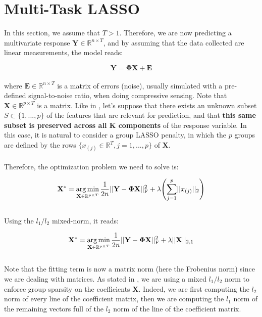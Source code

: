 \documentclass[a4paper,10pt]{article}
\theoremstyle{definition}
\begin{document}
\section{Multi-Task LASSO}
\label{section_4}

In this section, we assume that $T > 1$. Therefore, we are now predicting a multivariate response $\mathbf{Y}\in \mathbb{R}^{n \times T}$, and by assuming that the data collected are linear measurements, the model reads:

\begin{equation*}
    \mathbf{Y} = \mathbf{\Phi}\mathbf{X} + \mathbf{E}
\end{equation*}
\\
where $\mathbf{E} \in \mathbb{R}^{n \times T}$ is a matrix of errors (noise), usually simulated with a pre-defined signal-to-noise ratio, when doing compressive sensing. Note that $\mathbf{X} \in \mathbb{R}^{p \times T}$ is a matrix.
Like in , let's suppose that there exists an unknown subset $S \subset  \{1, ..., p\}$ of the features that are relevant for prediction, and that \textbf{this same subset is preserved across all K components} of the response
variable. In this case, it is natural to consider a group LASSO penalty, in which the $p$ groups are defined by the rows $\{x_{(j)} \in \mathbb{R}^T, j=1,...,p\}$ of $\mathbf{X}$.
\\
\\
Therefore, the optimization problem we need to solve is:

\begin{equation*}
    \mathbf{X}^* = \operatorname*{arg\,min}_{\mathbf{X} \in \mathbb{R}^{p \times T}} \frac{1}{2n} \lvert\lvert \mathbf{Y} - \mathbf{\Phi X} \rvert\rvert_{\text{F}}^2 + \lambda \Biggl( \sum_{j=1}^p \lvert\lvert x_{(j)} \rvert\rvert_2 \Biggr)
\end{equation*}
\\
Using the $l_1/l_2$ mixed-norm, it reads:

\begin{equation*}
    \mathbf{X}^* = \operatorname*{arg\,min}_{\mathbf{X} \in \mathbb{R}^{p \times T}} \frac{1}{2n} \lvert\lvert \mathbf{Y} - \mathbf{\Phi X} \rvert\rvert_{\text{F}}^2 + \lambda \lvert\lvert \mathbf{X} \rvert\rvert_{2, 1}
\end{equation*}
\\
Note that the fitting term is now a matrix norm (here the Frobenius norm) since we are dealing with matrices. As stated in , we are using a mixed $l_1/l_2$ norm to enforce group sparsity on the coefficients $\mathbf{X}$. Indeed,
we are first computing the $l_2$ norm of every line of the coefficient matrix, then we are computing the $l_1$ norm of the remaining vectors full of the $l_2$ norm of the line of the coefficient matrix.
\end{document}
